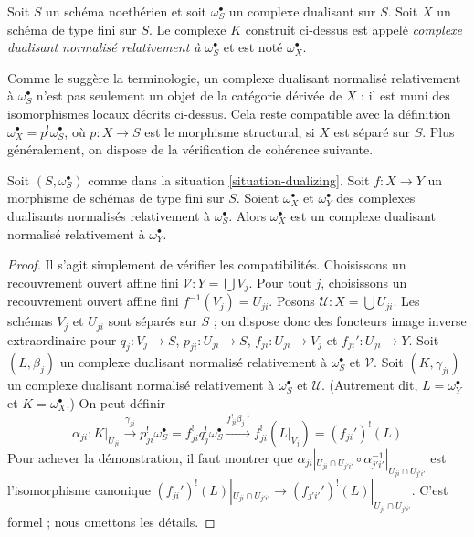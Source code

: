 \begin{definition}
\label{definition-good-dualizing}
Soit $S$ un schéma noethérien et soit $\omega_S^\bullet$ un complexe dualisant sur $S$. Soit $X$ un schéma de type fini sur $S$. Le complexe $K$ construit ci-dessus est appelé {\it complexe dualisant normalisé relativement à $\omega_S^\bullet$} et est noté $\omega_X^\bullet$.
\end{definition}

\noindent
Comme le suggère la terminologie, un complexe dualisant normalisé relativement à $\omega_S^\bullet$ n'est pas seulement un objet de la catégorie dérivée de $X$ : il est muni des isomorphismes locaux décrits ci-dessus. Cela reste compatible avec la définition $\omega_X^\bullet = p^!\omega_S^\bullet$, où $p : X \to S$ est le morphisme structural, si $X$ est séparé sur $S$. Plus généralement, on dispose de la vérification de cohérence suivante.

\begin{lemma}
\label{lemma-good-over-both}
Soit $(S, \omega_S^\bullet)$ comme dans la situation \ref{situation-dualizing}. Soit $f : X \to Y$ un morphisme de schémas de type fini sur $S$. Soient $\omega_X^\bullet$ et $\omega_Y^\bullet$ des complexes dualisants normalisés relativement à $\omega_S^\bullet$. Alors $\omega_X^\bullet$ est un complexe dualisant normalisé relativement à $\omega_Y^\bullet$.
\end{lemma}

\begin{proof}
Il s'agit simplement de vérifier les compatibilités. Choisissons un recouvrement ouvert affine fini $\mathcal{V} : Y = \bigcup V_j$. Pour tout $j$, choisissons un recouvrement ouvert affine fini $f^{-1}(V_j) = U_{ji}$. Posons $\mathcal{U} : X = \bigcup U_{ji}$. Les schémas $V_j$ et $U_{ji}$ sont séparés sur $S$ ; on dispose donc des foncteurs image inverse extraordinaire pour $q_j : V_j \to S$, $p_{ji} : U_{ji} \to S$, $f_{ji} : U_{ji} \to V_j$ et $f_{ji}' : U_{ji} \to Y$. Soit $(L, \beta_j)$ un complexe dualisant normalisé relativement à $\omega_S^\bullet$ et $\mathcal{V}$. Soit $(K, \gamma_{ji})$ un complexe dualisant normalisé relativement à $\omega_S^\bullet$ et $\mathcal{U}$. (Autrement dit, $L = \omega_Y^\bullet$ et $K = \omega_X^\bullet$.) On peut définir
$$
\alpha_{ji} :
K|_{U_{ji}} \xrightarrow{\gamma_{ji}}
p_{ji}^!\omega_S^\bullet = f_{ji}^!q_j^!\omega_S^\bullet
\xrightarrow{f_{ji}^!\beta_j^{-1}} f_{ji}^!(L|_{V_j}) =
(f_{ji}')^!(L)
$$
Pour achever la démonstration, il faut montrer que
$\alpha_{ji}|_{U_{ji} \cap U_{j'i'}}
\circ \alpha_{j'i'}^{-1}|_{U_{ji} \cap U_{j'i'}}$
est l'isomorphisme canonique $(f_{ji}')^!(L)|_{U_{ji} \cap U_{j'i'}} \to
(f_{j'i'}')^!(L)|_{U_{ji} \cap U_{j'i'}}$. C'est formel ; nous omettons les détails.
\end{proof}

